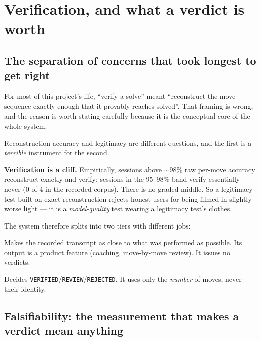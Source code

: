 \section{Verification, and what a verdict is worth}
\label{sec:verification}

\subsection{The separation of concerns that took longest to get right}

For most of this project's life, ``verify a solve'' meant ``reconstruct the
move sequence exactly enough that it provably reaches solved''. That framing
is wrong, and the reason is worth stating carefully because it is the
conceptual core of the whole system.

Reconstruction accuracy and legitimacy are different questions, and the
first is a \emph{terrible} instrument for the second.

\begin{keybox}
\textbf{Verification is a cliff.} Empirically, sessions above ${\sim}98\%$
raw per-move accuracy reconstruct exactly and verify; sessions in the 95--98\%
band verify essentially never (0 of 4 in the recorded corpus). There is no
graded middle. So a legitimacy test built on exact reconstruction rejects
honest users for being filmed in slightly worse light --- it is a
\emph{model-quality} test wearing a legitimacy test's clothes.
\end{keybox}

The system therefore splits into two tiers with different jobs:

\begin{description}[leftmargin=1.2em,style=nextline,itemsep=3pt]
\item[The accuracy tier (the group decode).] Makes the recorded transcript as
close to what was performed as possible. Its output is a product feature
(coaching, move-by-move review). It issues no verdicts.
\item[The legitimacy tier (the count gate).] Decides
\texttt{VERIFIED}/\texttt{REVIEW}/\texttt{REJECTED}. It uses only the
\emph{number} of moves, never their identity.
\end{description}

\subsection{Falsifiability: the measurement that makes a verdict mean
anything}
\label{sec:falsifiability-method}

